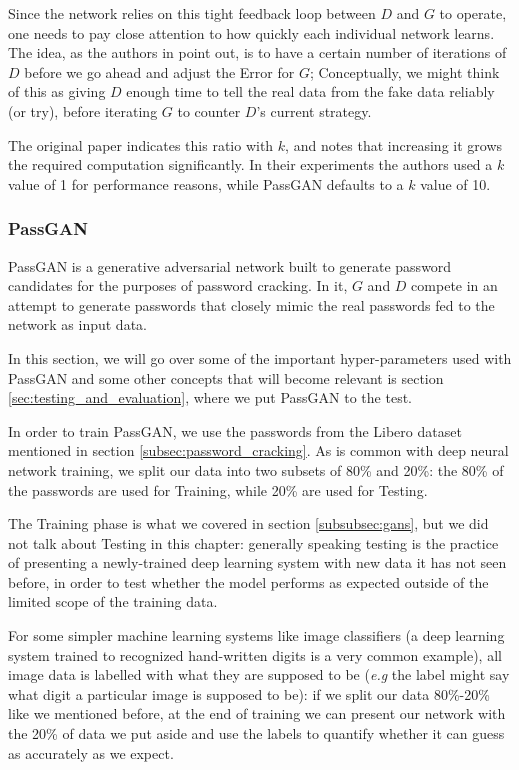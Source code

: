 Since the network relies on this tight feedback loop between $D$ and $G$ to operate, one needs to pay close attention to how quickly each individual network learns.
The idea, as the authors in \cite{Goodfellow2014} point out, is to have a certain number of iterations of $D$ before we go ahead and adjust the Error for $G$; Conceptually, we might think of this as giving $D$ enough time to tell the real data from the fake data reliably (or try), before iterating $G$ to counter $D$'s current strategy.

The original paper indicates this ratio with $k$, and notes that increasing it grows the required computation significantly. In their experiments the authors used a $k$ value of 1 for performance reasons, while PassGAN defaults to a $k$ value of 10\cite{PassGAN}.

\subsubsection{PassGAN}\label{subsubsec:gans-passgan}
PassGAN is a generative adversarial network built to generate password candidates for the purposes of password cracking. In it, $G$ and $D$ compete in an attempt to generate passwords that closely mimic the real passwords fed to the network as input data.

In this section, we will go over some of the important hyper-parameters used with PassGAN and some other concepts that will become relevant is section \ref{sec:testing_and_evaluation}, where we put PassGAN to the test.

In order to train PassGAN, we use the passwords from the Libero dataset mentioned in section \ref{subsec:password_cracking}. As is common with deep neural network training, we split our data into two subsets of 80\% and 20\%: the 80\% of the passwords are used for Training, while 20\% are used for Testing. 

 The Training phase is what we covered in section \ref{subsubsec:gans}, but we did not talk about Testing in this chapter: generally speaking testing is the practice of presenting a newly-trained deep learning system with new data it has not seen before, in order to test whether the model performs as expected outside of the limited scope of the training data.

For some simpler machine learning systems like image classifiers (a deep learning system trained to recognized hand-written digits is a very common example), all image data is labelled with what they are supposed to be (\emph{e.g} the label might say what digit a particular image is supposed to be): if we split our data 80\%-20\% like we mentioned before, at the end of training we can present our network with the 20\% of data we put aside and use the labels to quantify whether it can guess as accurately as we expect. 

